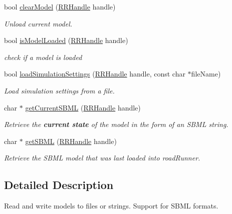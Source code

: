 \begin{DoxyCompactItemize}
bool \hyperlink{group__loadsave_ga78e637849c0d221eeee1168d101fcf30}{clear\+Model} (\hyperlink{rrc__types_8h_a1d68f0592372208fa5a5f2799ea4b3ae}{R\+R\+Handle} handle)
\begin{DoxyCompactList}\small\item\em Unload current model. \end{DoxyCompactList}\item 
bool \hyperlink{group__loadsave_ga533342a784ba4e48c16cc59e2307f609}{is\+Model\+Loaded} (\hyperlink{rrc__types_8h_a1d68f0592372208fa5a5f2799ea4b3ae}{R\+R\+Handle} handle)
\begin{DoxyCompactList}\small\item\em check if a model is loaded \end{DoxyCompactList}\item 
bool \hyperlink{group__loadsave_ga93797731c7c87ca775b2d4ce1ed3178c}{load\+Simulation\+Settings} (\hyperlink{rrc__types_8h_a1d68f0592372208fa5a5f2799ea4b3ae}{R\+R\+Handle} handle, const char $\ast$file\+Name)
\begin{DoxyCompactList}\small\item\em Load simulation settings from a file. \end{DoxyCompactList}\item 
char $\ast$ \hyperlink{group__loadsave_ga25a051f0d6f624e5f1634911cf545d79}{get\+Current\+S\+B\+M\+L} (\hyperlink{rrc__types_8h_a1d68f0592372208fa5a5f2799ea4b3ae}{R\+R\+Handle} handle)
\begin{DoxyCompactList}\small\item\em Retrieve the {\bfseries current state} of the model in the form of an S\+B\+M\+L string. \end{DoxyCompactList}\item 
char $\ast$ \hyperlink{group__loadsave_ga1ad04f6a6ac4ffccd25a056490bb6f53}{get\+S\+B\+M\+L} (\hyperlink{rrc__types_8h_a1d68f0592372208fa5a5f2799ea4b3ae}{R\+R\+Handle} handle)
\begin{DoxyCompactList}\small\item\em Retrieve the S\+B\+M\+L model that was last loaded into road\+Runner. \end{DoxyCompactList}\end{DoxyCompactItemize}


\subsection{Detailed Description}
Read and write models to files or strings. Support for S\+B\+M\+L formats. 



